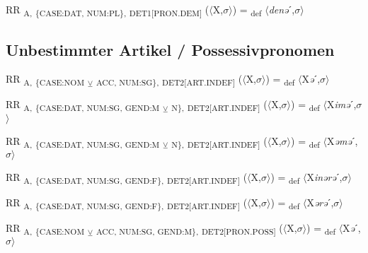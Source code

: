 {\begin{exe}
 RR \textsubscript{A,} \textsubscript{\{CASE:DAT, NUM:PL\},} \textsubscript{DET1[PRON.DEM]} ($\langle$X,$\sigma $$\rangle$) = \textsubscript{def} $\langle$\textit{denə}ˊ,$\sigma $$\rangle$
\end{exe}

\subsection{Unbestimmter Artikel / Possessivpronomen}

\begin{exe}
 RR \textsubscript{A,} \textsubscript{\{CASE:NOM} \textsubscript{${\veebar}$}\textsubscript{ ACC, NUM:SG\},} \textsubscript{DET2[ART.INDEF]} ($\langle$X,$\sigma $$\rangle$) = \textsubscript{def} $\langle$X\textit{ə}ˊ,$\sigma $$\rangle$
\end{exe}

\begin{exe}
 RR \textsubscript{A,} \textsubscript{\{CASE:DAT, NUM:SG, GEND:M} \textsubscript{${\veebar}$}\textsubscript{ N\},} \textsubscript{DET2[ART.INDEF]} ($\langle$X,$\sigma $$\rangle$) = \textsubscript{def} $\langle$X\textit{imə}ˊ,$\sigma $$\rangle$
\end{exe}

\begin{exe}
 RR \textsubscript{A,} \textsubscript{\{CASE:DAT, NUM:SG, GEND:M} \textsubscript{${\veebar}$}\textsubscript{ N\},} \textsubscript{DET2[ART.INDEF]} ($\langle$X,$\sigma $$\rangle$) = \textsubscript{def} $\langle$X\textit{əmə}ˊ,$\sigma $$\rangle$
\end{exe}

\begin{exe}
 RR \textsubscript{A,} \textsubscript{\{CASE:DAT, NUM:SG, GEND:F\},} \textsubscript{DET2[ART.INDEF]} ($\langle$X,$\sigma $$\rangle$) = \textsubscript{def} $\langle$X\textit{inərə}ˊ,$\sigma $$\rangle$
\end{exe}

\begin{exe}
 RR \textsubscript{A,} \textsubscript{\{CASE:DAT, NUM:SG, GEND:F\},} \textsubscript{DET2[ART.INDEF]} ($\langle$X,$\sigma $$\rangle$) = \textsubscript{def} $\langle$X\textit{ərə}ˊ,$\sigma $$\rangle$
\end{exe}

\begin{exe}
 RR \textsubscript{A,} \textsubscript{\{CASE:NOM} \textsubscript{${\veebar}$}\textsubscript{ ACC, NUM:SG, GEND:M\},} \textsubscript{DET2[PRON.POSS]} ($\langle$X,$\sigma $$\rangle$) = \textsubscript{def} $\langle$X\textit{ə}ˊ,$\sigma $$\rangle$
\end{exe}

}
